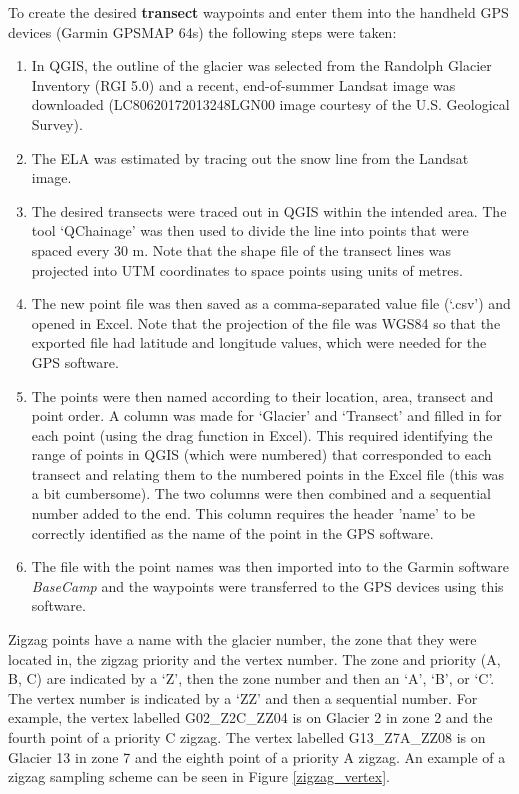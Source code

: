 \documentclass{sfuthesis}
\begin{document}
{\begin{appendices}
	To create the desired \textbf{transect} waypoints and enter them into the handheld GPS devices (Garmin GPSMAP 64s) the following steps were taken:
\begin{enumerate}
\item In QGIS, the outline of the glacier was selected from the Randolph Glacier Inventory (RGI 5.0) \citep{Pfeffer2014} and a recent, end-of-summer Landsat image was downloaded (LC80620172013248LGN00 image courtesy of the U.S. Geological Survey). 
\item The ELA was estimated by tracing out the snow line from the Landsat image.
\item The desired transects were traced out in QGIS within the intended area. The tool `QChainage' was then used to divide the line into points that were spaced every 30 m. Note that the shape file of the transect lines was projected into UTM coordinates to space points using units of metres. 
\item The new point file was then saved as a comma-separated value file (`.csv') and opened in Excel. Note that the projection of the file was WGS84 so that the exported file had latitude and longitude values, which were needed for the GPS software.
\item The points were then named according to their location, area, transect and point order. A column was made for `Glacier' and `Transect' and filled in for each point (using the drag function in Excel). This required identifying the range of points in QGIS (which were numbered) that corresponded to each transect and relating them to the numbered points in the Excel file (this was a bit cumbersome). The two columns were then combined and a sequential number added to the end. This column requires the header 'name' to be correctly identified as the name of the point in the GPS software.
\item The file with the point names was then imported into to the Garmin software \textit{BaseCamp} and the waypoints were transferred to the GPS devices using this software. 
\end{enumerate}

Zigzag points have a name with the glacier number, the zone that they were located in, the zigzag priority and the vertex number. The zone and priority (A, B, C) are indicated by a `Z', then the zone number and then an `A', `B', or `C'. The vertex number is indicated by a `ZZ' and then a sequential number. For example, the vertex labelled G02\_Z2C\_ZZ04 is on Glacier 2 in zone 2 and the fourth point of a priority C zigzag. The vertex labelled G13\_Z7A\_ZZ08 is on Glacier 13 in zone 7 and the eighth point of a priority A zigzag. An example of a zigzag sampling scheme can be seen in Figure \ref{zigzag_vertex}.


\end{appendices}}
\end{document}
